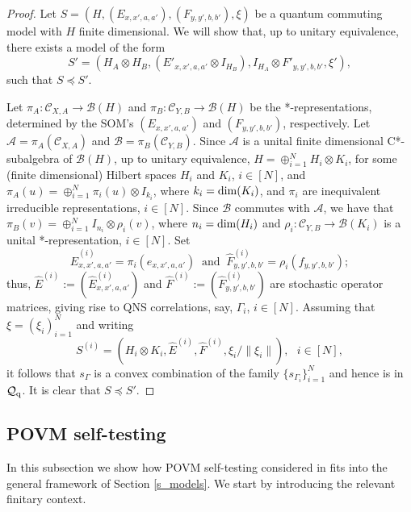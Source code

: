 \documentclass[11pt]{amsart}
\theoremstyle{definition}
\newcommand{\cl}[1]{\mathcal{#1}}
\begin{document}
\begin{proof}
Let $S = (H,(E_{x,x',a,a'}), (F_{y,y',b,b'}), \xi)$ 
be a quantum commuting model with $H$ finite dimensional. 
We will show that, up to unitary equivalence, there exists a 
model of the form
\begin{equation}\label{eq_S'mo}
S' = (H_A\otimes H_B, (E'_{x,x',a,a'}\otimes I_{H_B}), 
I_{H_A}\otimes F'_{y,y',b,b'},\xi'),
\end{equation}
such that $S\preceq S'$. 

Let $\pi_A : \cl C_{X,A}\to \cl B(H)$ and 
$\pi_B : \cl C_{Y,B}\to \cl B(H)$ be the *-representations, 
determined by the SOM's $(E_{x,x',a,a'})$ and $(F_{y,y',b,b'})$, 
respectively. 
Let $\cl A = \pi_A(\cl C_{X,A})$ and $\cl B = \pi_B(\cl C_{Y,B})$. 
Since $\cl A$ is a unital finite dimensional C*-subalgebra of $\cl B(H)$, 
up to unitary equivalence, 
$H = \oplus_{i=1}^N H_i\otimes K_i$, for some (finite dimensional) Hilbert 
spaces $H_i$ and $K_i$, $i\in [N]$, and 
$\pi_A(u) = \oplus_{i=1}^N \pi_i(u)\otimes I_{k_i}$, where $k_i = {\rm dim}(K_i)$, 
and $\pi_i$ are inequivalent irreducible representations, $i\in [N]$. 
Since $\cl B$ commutes with $\cl A$, 
we have that $\pi_B(v) = \oplus_{i=1}^N I_{n_i}\otimes \rho_i(v)$, where 
$n_i = {\rm dim}(H_i)$ and $\rho_i : \cl C_{Y,B}\to \cl B(K_i)$ is a 
unital *-representation, $i\in [N]$. 
Set 
$$\hat{E}^{(i)}_{x,x',a,a'} = \pi_i(e_{x,x',a,a'}) \ 
\mbox{ and } \ \hat{F}^{(i)}_{y,y',b,b'} = \rho_i(f_{y,y',b,b'});
$$
thus, $\hat{E}^{(i)} := \left(\hat{E}^{(i)}_{x,x',a,a'}\right)$ 
and $\hat{F}^{(i)} := \left(\hat{F}^{(i)}_{y,y',b,b'}\right)$ are stochastic 
operator matrices, giving rise to QNS correlations, say, $\Gamma_i$, 
$i\in [N]$. 
Assuming that $\xi = (\xi_i)_{i=1}^N$ and writing 
$$S^{(i)} = (H_i\otimes K_i, \hat{E}^{(i)}, \hat{F}^{(i)}, \xi_i/\|\xi_i\|),
\ \ \ i\in [N],$$
it follows that $s_{\Gamma}$ is a convex combination of 
the family $\{s_{\Gamma_i}\}_{i=1}^N$ and hence is in $\cl Q_{\rm q}$. 
It is clear that $S\preceq S'$. 
\end{proof}



\subsection{POVM self-testing}\label{ss_POVMNS}

In this subsection we show how POVM self-testing 
considered in \cite{pszz} fits into the general framework 
of Section \ref{s_models}. 
We start by introducing the relevant finitary context. 
\end{document}
